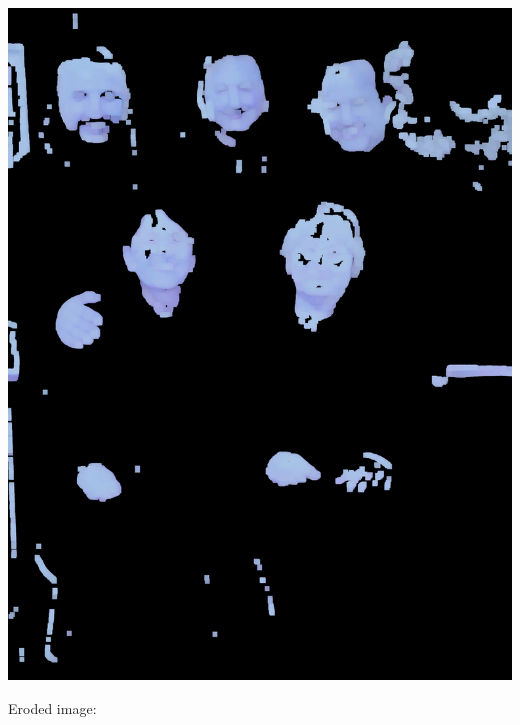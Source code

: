 \documentclass[conference]{IEEEtran}
\begin{document}
\includegraphics[scale=0.05]{dilation.jpg}

Eroded image: \\
\end{document}
